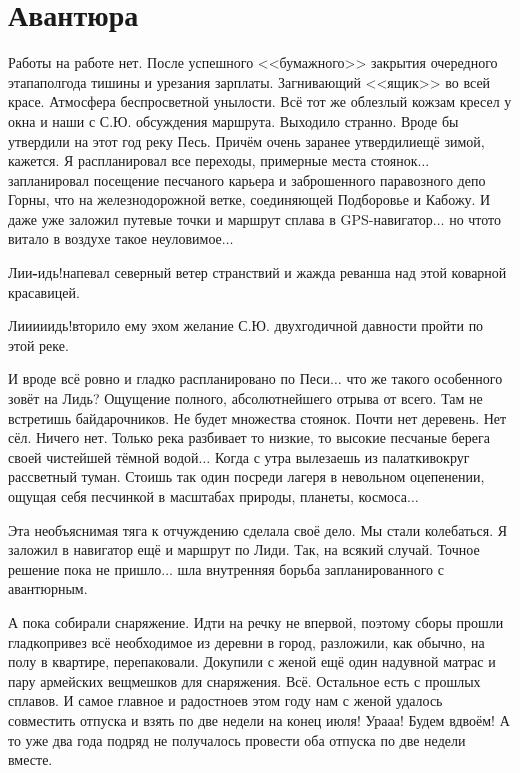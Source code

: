 \chapter{Авантюра} 
\vepsianrose

Работы на работе нет. После успешного <<бумажного>> закрытия очередного этапа\mdash полгода тишины и урезания зарплаты. Загнивающий <<ящик>> во всей красе. Атмосфера беспросветной унылости. Всё тот же облезлый кожзам кресел у окна и наши с С.Ю. обсуждения маршрута. Выходило странно. Вроде бы утвердили на этот год реку Песь. Причём очень заранее утвердили\mdash ещё зимой, кажется. Я распланировал все переходы, примерные места стоянок$\ldots$ запланировал посещение песчаного карьера и заброшенного паравозного депо Горны, что на железнодорожной ветке, соединяющей Подборовье и Кабожу. И даже уже заложил путевые точки и маршрут сплава в GPS-навигатор$\ldots$ но что\sdash то витало в воздухе такое неуловимое$\ldots$
 
\diagdash Ли\sdash и\textbf{-}идь!\mdash напевал северный ветер странствий и жажда реванша над этой коварной красавицей.

\diagdash Ли\sdash и\sdash и\sdash и\sdash идь!\mdash вторило ему эхом желание С.Ю. двухгодичной давности пройти по этой реке. 

И вроде всё ровно и гладко распланировано по Песи$\ldots$ что же такого особенного зовёт на Лидь? Ощущение полного, абсолютнейшего отрыва от всего. Там не встретишь байдарочников. Не будет множества стоянок. Почти нет деревень. Нет сёл. Ничего нет. Только река разбивает то низкие, то высокие песчаные берега своей чистейшей тёмной водой$\ldots$ Когда с утра вылезаешь из палатки\mdash вокруг рассветный туман. Стоишь так один посреди лагеря в невольном оцепенении, ощущая себя песчинкой в масштабах природы, планеты, космоса$\ldots$

Эта необъяснимая тяга к отчуждению сделала своё дело. Мы стали колебаться. Я заложил в навигатор ещё и маршрут по Лиди. Так, на всякий случай. Точное решение пока не пришло$\ldots$ шла внутренняя борьба запланированного с авантюрным.

А пока собирали снаряжение. Идти на речку не впервой, поэтому сборы прошли гладко\mdash привез всё необходимое из деревни в город, разложили, как обычно, на полу в квартире, перепаковали. Докупили с женой ещё один надувной матрас и пару армейских вещмешков для снаряжения. Всё. Остальное есть с прошлых сплавов. И самое главное и радостное\mdash в этом году нам с женой удалось совместить отпуска и взять по две недели на конец июля! Ура\sdash а\sdash а! Будем вдвоём! А то уже два года подряд не получалось провести оба отпуска по две недели вместе.

